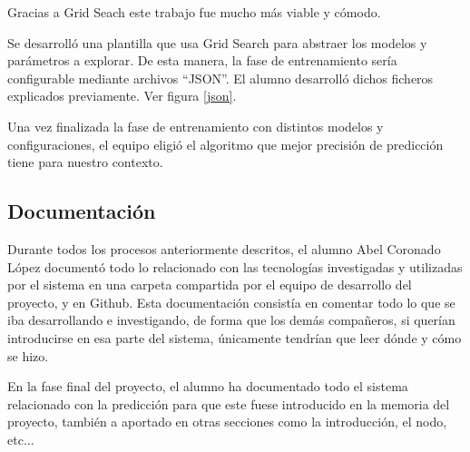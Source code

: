 Gracias a Grid Seach este trabajo fue mucho más viable y cómodo.

Se desarrolló una plantilla que usa Grid Search para abstraer los modelos y parámetros a explorar. De esta manera, la fase de entrenamiento sería configurable mediante archivos ``JSON''. El alumno desarrolló dichos ficheros explicados previamente. Ver figura \ref{json}.

Una vez finalizada la fase de entrenamiento con distintos modelos y configuraciones, el equipo eligió el algoritmo que mejor precisión de predicción tiene para nuestro contexto.

\subsection{Documentación}
Durante todos los procesos anteriormente descritos, el alumno Abel Coronado López documentó todo lo relacionado con las tecnologías investigadas y utilizadas por el sistema en una carpeta compartida por el equipo de desarrollo del proyecto, y en Github. Esta documentación consistía en comentar todo lo que se iba desarrollando e investigando, de forma que los demás compañeros, si querían introducirse en esa parte del sistema, únicamente tendrían que leer dónde y cómo se hizo.

En la fase final del proyecto, el alumno ha documentado todo el sistema relacionado con la predicción para que este fuese introducido en la memoria del proyecto, también a aportado en otras secciones como la introducción, el nodo, etc...